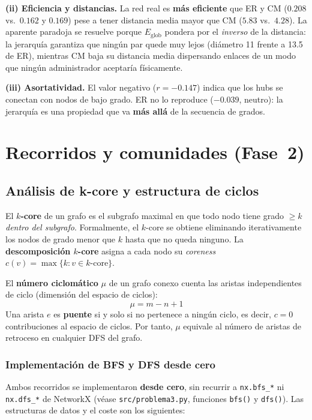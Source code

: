 \documentclass[11pt, a4paper]{article}
\newcommand{\code}[1]{\texttt{\small #1}}
\begin{document}
\textbf{(ii) Eficiencia y distancias.} La red real es \textbf{más eficiente}
que ER y CM ($0.208$ vs.\ $0.162$ y $0.169$) pese a tener distancia media
mayor que CM ($5.83$ vs.\ $4.28$). La aparente paradoja se resuelve porque
$E_{\text{glob}}$ pondera por el \textit{inverso} de la distancia: la
jerarquía garantiza que ningún par quede muy lejos (diámetro 11 frente a
13.5 de ER), mientras CM baja su distancia media dispersando enlaces de un
modo que ningún administrador aceptaría físicamente.

\textbf{(iii) Asortatividad.} El valor negativo ($r=-0.147$) indica que los
hubs se conectan con nodos de bajo grado. ER no lo reproduce ($-0.039$,
neutro): la jerarquía es una propiedad que va \textbf{más allá} de la
secuencia de grados.

\section{Recorridos y comunidades (Fase~2)}

\subsection{Análisis de k-core y estructura de ciclos}

El \textbf{$k$-core} de un grafo es el subgrafo maximal en que todo nodo
tiene grado $\geq k$ \textit{dentro del subgrafo}. Formalmente, el
$k$-core se obtiene eliminando iterativamente los nodos de grado menor que
$k$ hasta que no queda ninguno. La \textbf{descomposición $k$-core} asigna
a cada nodo su \textit{coreness} $c(v) = \max\{k : v \in k\text{-core}\}$.

El \textbf{número ciclomático} $\mu$ de un grafo conexo cuenta las aristas
independientes de ciclo (dimensión del espacio de ciclos):
\[
  \mu = m - n + 1
\]
Una arista $e$ es \textbf{puente} si y solo si no pertenece a ningún ciclo,
es decir, $c = 0$ contribuciones al espacio de ciclos. Por tanto,
$\mu$ equivale al número de aristas de retroceso en cualquier DFS del grafo.

\subsubsection*{Implementación de BFS y DFS desde cero}

Ambos recorridos se implementaron \textbf{desde cero}, sin recurrir a
\code{nx.bfs\_*} ni \code{nx.dfs\_*} de NetworkX (véase
\code{src/problema3.py}, funciones \code{bfs()} y \code{dfs()}). Las
estructuras de datos y el coste son los siguientes:
\end{document}
